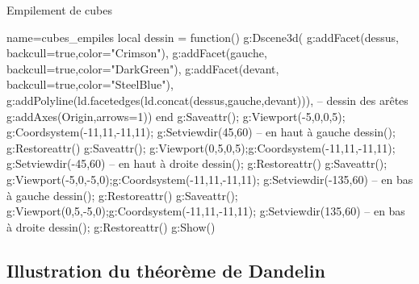 \begin{demo}{Empilement de cubes}
\begin{luadraw}{name=cubes_empiles}
local dessin = function()
    g:Dscene3d(
        g:addFacet(dessus, {backcull=true,color="Crimson"}), g:addFacet(gauche, {backcull=true,color="DarkGreen"}),
        g:addFacet(devant, {backcull=true,color="SteelBlue"}),
        g:addPolyline(ld.facetedges(ld.concat(dessus,gauche,devant))), -- dessin des arêtes
        g:addAxes(Origin,{arrows=1}))
end
g:Saveattr(); g:Viewport(-5,0,0,5); g:Coordsystem(-11,11,-11,11); g:Setviewdir(45,60) -- en haut à gauche
 dessin(); g:Restoreattr()
g:Saveattr(); g:Viewport(0,5,0,5);g:Coordsystem(-11,11,-11,11); g:Setviewdir(-45,60) -- en haut à droite
dessin(); g:Restoreattr()
g:Saveattr(); g:Viewport(-5,0,-5,0);g:Coordsystem(-11,11,-11,11); g:Setviewdir(-135,60) -- en bas à gauche
dessin(); g:Restoreattr()
g:Saveattr(); g:Viewport(0,5,-5,0);g:Coordsystem(-11,11,-11,11); g:Setviewdir(135,60) -- en bas à droite
dessin(); g:Restoreattr()
g:Show()
\end{luadraw}
\end{demo}


\subsection{Illustration du théorème de Dandelin}

